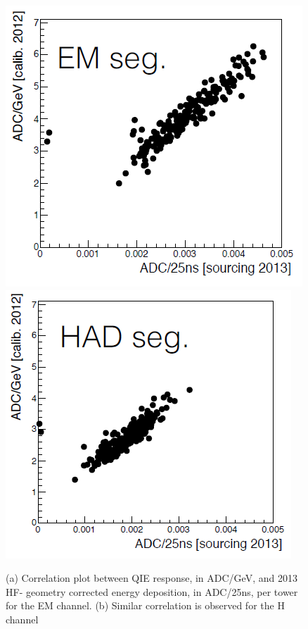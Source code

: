 \begin{figure}[htb]
   \begin{center}
      \includegraphics[width=.45\textwidth]{figures/ch_hfcalibration/QIE_Res_EM.png}
      \includegraphics[width=.45\textwidth]{figures/ch_hfcalibration/QIE_Res_H.png}
      \caption{(a) Correlation plot between QIE response, in ADC/GeV, and 2013 HF-
               geometry corrected energy deposition, in ADC/25\unit{ns}, per tower
               for the EM channel.
               (b) Similar correlation is observed for the H channel}
      \label{fig:QIE_Slope}
   \end{center}
\end{figure}

